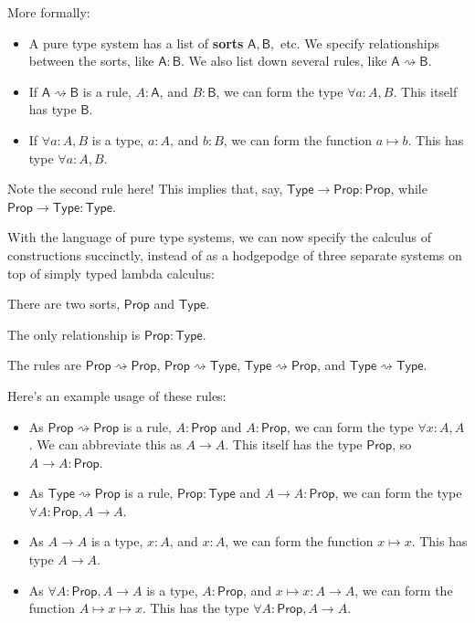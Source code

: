 \documentclass[11pt,paper=letter]{scrartcl}
\newcommand{\sf}{\mathsf}
\newcommand{\prop}{\mathsf{Prop}}
\newcommand{\type}{\mathsf{Type}}
\newcommand{\toto}{\rightsquigarrow}
\begin{document}
More formally:
\begin{itemize}
\item A pure type system has a list of \textbf{sorts} $\sf{A}, \sf{B},$ etc. We specify relationships between the sorts, like $\sf{A} : \sf{B}$. We also list down several rules, like $\sf{A} \toto \sf{B}$.
\item If $\sf{A} \toto \sf{B}$ is a rule, $A : \sf{A}$, and $B: \sf{B}$, we can form the type $\forall a: A, B$. This itself has type $\sf{B}$.
\item If $\forall a: A, B$ is a type, $a : A$, and $b : B$, we can form the function $a \mapsto b$. This has type $\forall a: A, B$.
\end{itemize}

Note the second rule here! This implies that, say, $\type \to \prop : \prop$, while $\prop \to \type : \type$.

With the language of pure type systems, we can now specify the calculus of constructions succinctly, instead of as a hodgepodge of three separate systems on top of simply typed lambda calculus:
\begin{itemthin}
\item There are two sorts, $\prop$ and $\type$.
\item The only relationship is $\prop : \type$.
\item The rules are $\prop \toto \prop$, $\prop \toto \type$, $\type \toto \prop$, and $\type \toto \type$.
\end{itemthin}
Here's an example usage of these rules:
\begin{itemize}
\item As $\prop \toto \prop$ is a rule, $A: \prop$ and $A: \prop$, we can form the type $\forall x: A, A$. We can abbreviate this as $A \to A$. This itself has the type $\prop$, so $A \to A: \prop$.
\item As $\type \toto \prop$ is a rule, $\prop: \type$ and $A \to A: \prop$, we can form the type $\forall A: \prop, A \to A$.
\item As $A \to A$ is a type, $x: A$, and $x: A$, we can form the function $x \mapsto x$. This has type $A \to A$.
\item As $\forall A: \prop, A \to A$ is a type, $A: \prop$, and $x \mapsto x: A \to A$, we can form the function $A \mapsto x \mapsto x$. This has the type $\forall A: \prop, A \to A$.
\end{itemize}
\end{document}
